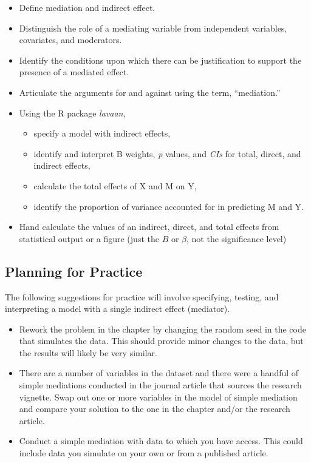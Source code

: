\documentclass[
  11pt,
]{book}
\providecommand{\tightlist}{%
  \setlength{\itemsep}{0pt}\setlength{\parskip}{0pt}}
\begin{document}
\begin{itemize}
\tightlist
\item
  Define mediation and indirect effect.
\item
  Distinguish the role of a mediating variable from independent variables, covariates, and moderators.
\item
  Identify the conditions upon which there can be justification to support the presence of a mediated effect.
\item
  Articulate the arguments for and against using the term, ``mediation.''
\item
  Using the R package \emph{lavaan},

  \begin{itemize}
  \tightlist
  \item
    specify a model with indirect effects,
  \item
    identify and interpret B weights, \emph{p} values, and \emph{CIs} for total, direct, and indirect effects,
  \item
    calculate the total effects of X and M on Y,
  \item
    identify the proportion of variance accounted for in predicting M and Y.
  \end{itemize}
\item
  Hand calculate the values of an indirect, direct, and total effects from statistical output or a figure (just the \(B\) or \(\beta\), not the significance level)
\end{itemize}

\hypertarget{planning-for-practice-4}{%
\subsection{Planning for Practice}\label{planning-for-practice-4}}

The following suggestions for practice will involve specifying, testing, and interpreting a model with a single indirect effect (mediator).

\begin{itemize}
\tightlist
\item
  Rework the problem in the chapter by changing the random seed in the code that simulates the data. This should provide minor changes to the data, but the results will likely be very similar.
\item
  There are a number of variables in the dataset and there were a handful of simple mediations conducted in the journal article that sources the research vignette. Swap out one or more variables in the model of simple mediation and compare your solution to the one in the chapter and/or the research article.
\item
  Conduct a simple mediation with data to which you have access. This could include data you simulate on your own or from a published article.
\end{itemize}
\end{document}
